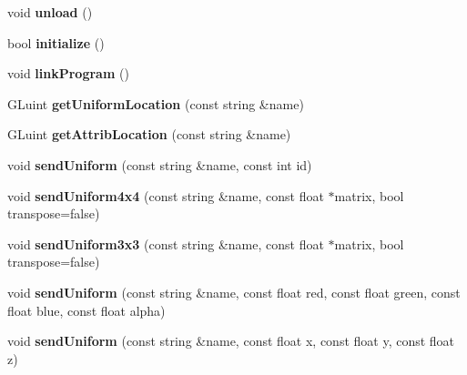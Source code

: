 \begin{DoxyCompactItemize}
\item 
\hypertarget{classMob2DFx_a583fc0725280ce099bbd3f60a33bb707}{
void {\bfseries unload} ()}
\label{classMob2DFx_a583fc0725280ce099bbd3f60a33bb707}

\item 
\hypertarget{classMob2DFx_ad826634d31cfc2044f9ca213b9fa07cc}{
bool {\bfseries initialize} ()}
\label{classMob2DFx_ad826634d31cfc2044f9ca213b9fa07cc}

\item 
\hypertarget{classMob2DFx_ade0503070f48769b09300d9557c3a60f}{
void {\bfseries linkProgram} ()}
\label{classMob2DFx_ade0503070f48769b09300d9557c3a60f}

\item 
\hypertarget{classMob2DFx_a8521c6d9267e1721aa70dee8ed713e1a}{
GLuint {\bfseries getUniformLocation} (const string \&name)}
\label{classMob2DFx_a8521c6d9267e1721aa70dee8ed713e1a}

\item 
\hypertarget{classMob2DFx_ad3a1a757bba50df71ed1f0bda2daa033}{
GLuint {\bfseries getAttribLocation} (const string \&name)}
\label{classMob2DFx_ad3a1a757bba50df71ed1f0bda2daa033}

\item 
\hypertarget{classMob2DFx_a5020b869a49aee6280b48f251cd56a07}{
void {\bfseries sendUniform} (const string \&name, const int id)}
\label{classMob2DFx_a5020b869a49aee6280b48f251cd56a07}

\item 
\hypertarget{classMob2DFx_a1a6659cb9386e140aef2ee12ea603843}{
void {\bfseries sendUniform4x4} (const string \&name, const float $\ast$matrix, bool transpose=false)}
\label{classMob2DFx_a1a6659cb9386e140aef2ee12ea603843}

\item 
\hypertarget{classMob2DFx_a75cacf4dbf06e7a66e0866c6238bf2cc}{
void {\bfseries sendUniform3x3} (const string \&name, const float $\ast$matrix, bool transpose=false)}
\label{classMob2DFx_a75cacf4dbf06e7a66e0866c6238bf2cc}

\item 
\hypertarget{classMob2DFx_a5bcc5c9963bcf3dc24df57bbf0916ecf}{
void {\bfseries sendUniform} (const string \&name, const float red, const float green, const float blue, const float alpha)}
\label{classMob2DFx_a5bcc5c9963bcf3dc24df57bbf0916ecf}

\item 
\hypertarget{classMob2DFx_a3f9f8c224a4a50f58150601978934470}{
void {\bfseries sendUniform} (const string \&name, const float x, const float y, const float z)}
\label{classMob2DFx_a3f9f8c224a4a50f58150601978934470}


\end{DoxyCompactItemize}
